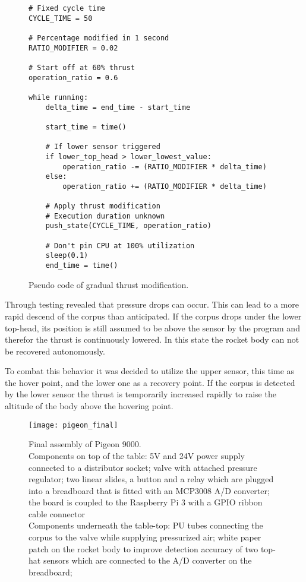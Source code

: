 \begin{figure}[h]
\begin{verbatim}
# Fixed cycle time
CYCLE_TIME = 50

# Percentage modified in 1 second
RATIO_MODIFIER = 0.02

# Start off at 60% thrust
operation_ratio = 0.6

while running:
    delta_time = end_time - start_time
    
    start_time = time()

    # If lower sensor triggered
    if lower_top_head > lower_lowest_value:
        operation_ratio -= (RATIO_MODIFIER * delta_time)
    else:
        operation_ratio += (RATIO_MODIFIER * delta_time)

    # Apply thrust modification
    # Execution duration unknown
    push_state(CYCLE_TIME, operation_ratio)

    # Don't pin CPU at 100% utilization
    sleep(0.1)
    end_time = time()
\end{verbatim}
\caption{Pseudo code of gradual thrust modification.}
\end{figure}

Through testing revealed that pressure drops can occur. This can lead to a more rapid descend of the corpus than anticipated. If the corpus drops under the lower top-head, its position is still assumed to be above the sensor by the program and therefor the thrust is continuously lowered. In this state the rocket body can not be recovered autonomously. 

To combat this behavior it was decided to utilize the upper sensor, this time as the hover point, and the lower one as a recovery point. If the corpus is detected by the lower sensor the thrust is temporarily increased rapidly to raise the altitude of the body above the hovering point. 

\begin{figure}[H]

\texttt{[image: pigeon\_final]}

\caption{Final assembly of Pigeon 9000. \\
Components on top of the table: 5V and 24V power supply connected to a distributor socket; valve with attached pressure regulator; two linear slides, a button and a relay which are plugged into a breadboard that is fitted with an MCP3008 A/D converter; the board is coupled to the Raspberry Pi 3 with a GPIO ribbon cable connector \\
Components underneath the table-top: PU tubes connecting the corpus to the valve while supplying pressurized air; white paper patch on the rocket body to improve detection accuracy of two top-hat sensors which are connected to the A/D converter on the breadboard;}
\end{figure}

